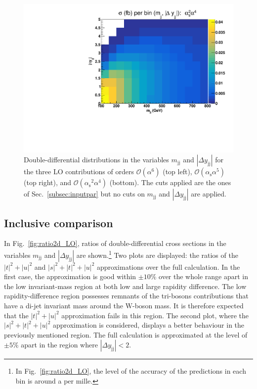 \documentclass[twocolumn,epjc3]{svjour3} %
\newcommand{\Pj}{\ensuremath{\text{j}}\xspace}
\newcommand{\PW}{\ensuremath{\text{W}}\xspace}
\newcommand{\alphas}{\ensuremath{\alpha_\text{s}}\xspace}
\begin{document}
\begin{figure}[hbt]
    \includegraphics[scale=0.395]{figures/scanfigures/scan_ew4qcd2.pdf}
    \caption{Double-differential distributions in the variables $m_{\Pj\Pj}$ and $|\Delta y_{\Pj\Pj}|$ for the three LO contributions of orders $\mathcal{O}(\alpha^6)$ (top left), $\mathcal{O}(\alphas\alpha^5)$ (top right), and $\mathcal{O}(\alphas^2 \alpha^4)$ (bottom).
    The cuts applied are the ones of Sec.~\protect\ref{subsec:inputpar} but no cuts on $m_{\Pj\Pj}$ and $|\Delta y_{\Pj\Pj}|$ are applied.
    }
    \label{fig:mjjdyjj_2d_LO}
    \end{figure}
    \subsection{Inclusive comparison}
        \label{subsec:LOinclusive}
    In Fig.~\ref{fig:ratio2d_LO}, ratios of double-differential cross sections in the variables  $m_{\Pj\Pj}$ and $|\Delta y_{\Pj\Pj}|$ are shown.\footnote{In Fig.~\ref{fig:ratio2d_LO}, the level of the accuracy of the predictions in each bin is around a per mille.}
    Two plots are displayed: the ratios of the $|t|^2 + |u|^2$ and $|s|^2 + |t|^2 + |u|^2$ approximations over the full calculation.
    In the first case, the approximation is good within $\pm10\%$ over the whole range apart in the low invariant-mass region at both low and large rapidity difference.
    The low rapidity-difference region possesses remnants of the tri-bosons contributions that have a di-jet invariant mass around the $\PW$-boson mass.
    It is therefore expected that the $|t|^2 + |u|^2$ approximation fails in this region.
    The second plot, where the $|s|^2 + |t|^2 + |u|^2$ approximation is considered, displays a better behaviour in the previously mentioned region.
    The full calculation is approximated at the level of $\pm5\%$ apart in the region where $|\Delta y_{\Pj\Pj}| < 2$.
\end{document}
